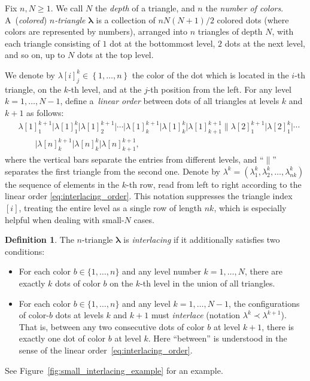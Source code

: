 \documentclass[10pt,a4paper]{amsart}
\numberwithin{equation}{section}
\theoremstyle{definition}
\newtheorem{Definition}[Theorem]{Definition}
\begin{document}
Fix $n,N\ge1$.
	We call $N$ the \emph{depth} of a triangle, and $n$ the \emph{number of
	colors}.
	A~(\emph{colored}) \emph{$n$\nobreakdash-triangle} $\boldsymbol\lambda$ is a
	collection of $nN(N+1)/2$ colored dots (where colors are represented by numbers), arranged
	into $n$ triangles of depth $N$, with each triangle consisting of $1$ dot at
	the bottommost level, $2$ dots at the next level, and so on, up to $N$ dots
	at the top level.

	We denote by $\lambda[i]^{k}_{j} \in\left\{ 1,\dots,n  \right\}$ the color
	of the dot which is located in the $i$-th triangle, on the $k$-th level, and
	at the $j$-th position from the left.
	For any level $k=1,\dots,N-1$, define a~\emph{linear order} between dots
	of all triangles at
	levels $k$ and $k+1$ as follows:
	\begin{align}
		& \lambda[1]^{k+1}_{1} \big\vert
		\lambda[1]^{k}_{1} \big\vert \lambda[1]^{k+1}_{2} \big\vert \cdots \big\vert
		\lambda[1]^{k+1}_{k} \big\vert \lambda[1]^k_k \big\vert
		\lambda[1]^{k+1}_{k+1}
		\big\|
		\lambda[2]^{k+1}_1 \big\vert \lambda[2]^k_1 \big\vert
		\cdots \nonumber\\
&\qquad \big\vert \lambda[n]^{k+1}_k \big\vert \lambda[n]^k_k \big\vert
		\lambda[n]^{k+1}_{k+1},\label{eq:interlacing_order}
	\end{align}
	where the vertical bars separate the entries from different levels,
	and ``$\|$'' separates the first triangle from the second one.
	Denote by $\lambda^{k}=(\lambda^k_1,\lambda^k_2,\dots,\lambda^k_{nk})$ the
	sequence of elements in the $k$-th row, read from left to right according to
	the linear order \eqref{eq:interlacing_order}.
	This notation suppresses the triangle index $[i]$, treating the entire level
	as a single row of length $nk$, which is especially helpful when dealing
	with small-$N$ cases.

\begin{Definition}
	\label{def:colored_interlacing_triangle} The $n$-triangle $\boldsymbol\lambda$ is \emph{interlacing} if it additionally satisfies two conditions:
	\begin{itemize}\itemsep=0pt
		\item For each color $b\in \{ 1,\dots,n  \}$
		and any level number $k=1,\dots,N$, there are exactly $k$ dots of color
		$b$ on the $k$-th level in the union of all triangles.
		\item
		For each color $b\in \{ 1,\dots,n  \}$ and any level
		$k=1,\dots,N-1$, the configurations of color-$b$ dots at levels $k$ and
		$k+1$ must \emph{interlace} (notation $\lambda^k\prec \lambda^{k+1}$).
		That is, between any two consecutive dots of color $b$ at level $k+1$,
		there is exactly one dot of color $b$ at level $k$.
		Here ``between'' is understood in the sense of the linear order~\eqref{eq:interlacing_order}.
	\end{itemize}
	See Figure~\ref{fig:small_interlacing_example} for an example.
\end{Definition}
\end{document}
